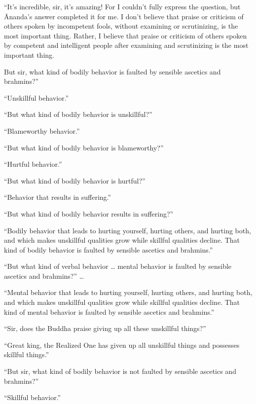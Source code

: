 \documentclass[12pt,openany]{book}%
\begin{document}
“It’s incredible, sir, it’s amazing! For I couldn’t fully express the question, but Ānanda’s answer completed it for me. I don’t believe that praise or criticism of others spoken by incompetent fools, without examining or scrutinizing, is the most important thing. Rather, I believe that praise or criticism of others spoken by competent and intelligent people after examining and scrutinizing is the most important thing. 

But sir, what kind of bodily behavior is faulted by sensible ascetics and brahmins?” 

“Unskillful behavior.” 

“But what kind of bodily behavior is unskillful?” 

“Blameworthy behavior.” 

“But what kind of bodily behavior is blameworthy?” 

“Hurtful behavior.” 

“But what kind of bodily behavior is hurtful?” 

“Behavior that results in suffering.” 

“But what kind of bodily behavior results in suffering?” 

“Bodily behavior that leads to hurting yourself, hurting others, and hurting both, and which makes unskillful qualities grow while skillful qualities decline. That kind of bodily behavior is faulted by sensible ascetics and brahmins.” 

“But what kind of verbal behavior … mental behavior is faulted by sensible ascetics and brahmins?” … 

“Mental behavior that leads to hurting yourself, hurting others, and hurting both, and which makes unskillful qualities grow while skillful qualities decline. That kind of mental behavior is faulted by sensible ascetics and brahmins.” 

“Sir, does the Buddha praise giving up all these unskillful things?” 

“Great king, the Realized One has given up all unskillful things and possesses skillful things.” 

“But sir, what kind of bodily behavior is not faulted by sensible ascetics and brahmins?” 

“Skillful behavior.” 
\end{document}
